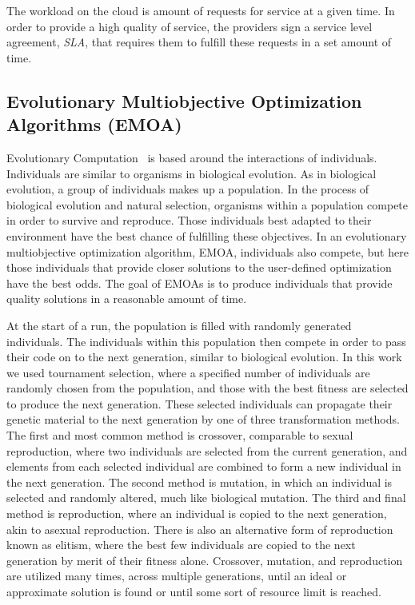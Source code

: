 \documentclass[12pt]{article}
\begin{document}
The workload on the cloud is amount of requests for service at a given time. In order to provide a high quality of service, the providers sign a service level agreement, \emph{SLA}, that requires them to fulfill these requests in a set amount of time. 

\subsection{Evolutionary Multiobjective Optimization Algorithms (EMOA)}
\label{sec:EMOA}

Evolutionary Computation~\cite{poli08:fieldguide} is based around the interactions of individuals. Individuals are similar to organisms in biological evolution. As in biological evolution, a group of individuals makes up a population. In the process of biological evolution and natural selection, organisms within a population compete in order to survive and reproduce. Those individuals best adapted to their environment have the best chance of fulfilling these objectives.  In an evolutionary multiobjective optimization algorithm, EMOA, individuals also compete, but here those individuals that provide closer solutions to the user-defined optimization have the best odds. The goal of EMOAs is to produce individuals that provide quality solutions in a reasonable amount of time. 

At the start of a run, the population is filled with randomly generated individuals. The individuals within this population then compete in order to pass their code on to the next generation, similar to biological evolution. In this work we used tournament selection, where a specified number of individuals are randomly chosen from the population, and those with the best fitness are selected to produce the next generation. These selected individuals can propagate their genetic material to the next generation by one of three transformation methods. The first and most common method is crossover, comparable to sexual reproduction, where two individuals are selected from the current generation, and elements from each selected individual are combined to form a new individual in the next generation. The second method is mutation, in which an individual is selected and randomly altered, much like biological mutation. The third and final method is reproduction, where an individual is copied to the next generation, akin to asexual reproduction. There is also an alternative form of reproduction known as elitism, where the best few individuals are copied to the next generation by merit of their fitness alone. Crossover, mutation, and reproduction are utilized many times, across multiple generations, until an ideal or approximate solution is found or until some sort of resource limit is reached.
\end{document}

